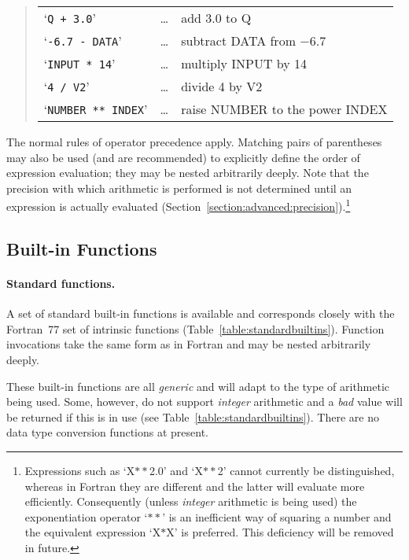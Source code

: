 \documentclass[twoside,11pt]{article}
\newcommand{\xlabel}[1]{}
\newcommand{\name}[1]{\mbox{\small{#1}}}
\begin{document}
\begin{quote}
\begin{center}
\begin{tabular}{lcl}

`\texttt{Q + 3.0}' & \ldots & add 3.0 to Q\\
`\texttt{-6.7 - DATA}' & \dots & subtract \name{DATA} from $-$6.7\\
`\texttt{INPUT * 14}' & \ldots & multiply \name{INPUT} by 14 \\
`\texttt{4 / V2}' & \ldots & divide 4 by \name{V2}\\
`\texttt{NUMBER ** INDEX}' & \ldots & raise \name{NUMBER} to the power 
\name{INDEX}

\end{tabular}
\end{center}
\end{quote}

The normal rules of operator precedence apply.
Matching pairs of parentheses may also be used (and are recommended) to
explicitly define the order of expression evaluation; they may be nested
arbitrarily deeply. 
Note that the precision with which arithmetic is performed is not determined
until an expression is actually evaluated
(Section~\ref{section:advanced:precision}).\footnote{ 
Expressions such as `X$**$2.0' and `X$**$2' cannot currently be
distinguished, whereas in Fortran they are different and the latter will
evaluate more efficiently. 
Consequently (unless \emph{integer} arithmetic is being used) the
exponentiation operator `$**$' is an inefficient way of squaring a
number and the equivalent expression `X$*$X' is preferred. 
This deficiency will be removed in future.}


\subsection{\xlabel{builtin_functions}Built-in Functions}

\paragraph{Standard functions.}
A set of standard built-in functions is available and corresponds closely
with the Fortran~77 set of intrinsic functions
(Table~\ref{table:standardbuiltins}). 
Function invocations take the same form as in Fortran and may be nested
arbitrarily deeply. 

These built-in functions are all \emph{generic} and will adapt to the type of
arithmetic being used. 
Some, however, do not support \emph{integer} arithmetic and a \emph{bad} value
will be returned if this is in use (see Table~\ref{table:standardbuiltins}). 
There are no data type conversion functions at present.
\end{document}
